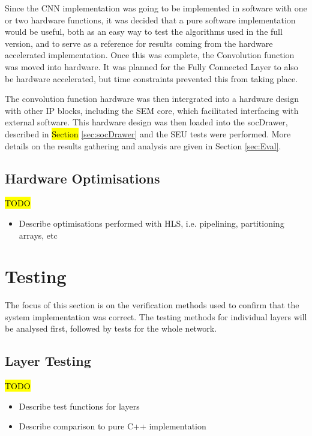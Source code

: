 \documentclass[12pt]{article}
\begin{document}
Since the CNN implementation was going to be implemented in software with one or two hardware functions, it was decided that a pure software implementation would be useful, both as an easy way to test the algorithms used in the full version, and to serve as a reference for results coming from the hardware accelerated implementation. Once this was complete, the Convolution function was moved into hardware. It was planned for the Fully Connected Layer to also be hardware accelerated, but time constraints prevented this from taking place. 

The convolution function hardware was then intergrated into a hardware design with other IP blocks, including the SEM core, which facilitated interfacing with external software. This hardware design was then loaded into the socDrawer, described in \hl{Section} \ref{sec:socDrawer} and the SEU tests were performed. More details on the results gathering and analysis are given in Section \ref{sec:Eval}.

\subsection{Hardware Optimisations}
\label{sec:Imp-Optimisations}


\hl{TODO}

\begin{itemize}
\item Describe optimisations performed with HLS, i.e. pipelining, partitioning arrays, etc
\end{itemize}

\newpage

\section{Testing}
\label{sec:Test}


The focus of this section is on the verification methods used to confirm that the system implementation was correct. The testing methods for individual layers will be analysed first, followed by tests for the whole network.

\subsection{Layer Testing}
\label{sec:Test-Layers}


\hl{TODO}

\begin{itemize}
\item Describe test functions for layers
\item Describe comparison to pure C++ implementation
\end{itemize}
\end{document}
